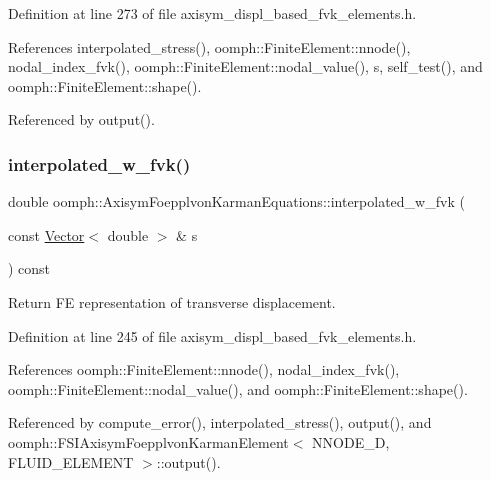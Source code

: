 Definition at line 273 of file axisym\+\_\+displ\+\_\+based\+\_\+fvk\+\_\+elements.\+h.



References interpolated\+\_\+stress(), oomph\+::\+Finite\+Element\+::nnode(), nodal\+\_\+index\+\_\+fvk(), oomph\+::\+Finite\+Element\+::nodal\+\_\+value(), s, self\+\_\+test(), and oomph\+::\+Finite\+Element\+::shape().



Referenced by output().

\mbox{\label{classoomph_1_1AxisymFoepplvonKarmanEquations_aca5188335be3d0432fbf92d493026558}} 
\subsubsection{\texorpdfstring{interpolated\+\_\+w\+\_\+fvk()}{interpolated\_w\_fvk()}\hspace{0.1cm}{\footnotesize\ttfamily [1/2]}}
{\footnotesize\ttfamily double oomph\+::\+Axisym\+Foepplvon\+Karman\+Equations\+::interpolated\+\_\+w\+\_\+fvk (\begin{DoxyParamCaption}\item[{const \hyperlink{classoomph_1_1Vector}{Vector}$<$ double $>$ \&}]{s }\end{DoxyParamCaption}) const\hspace{0.3cm}{\ttfamily [inline]}}



Return FE representation of transverse displacement. 



Definition at line 245 of file axisym\+\_\+displ\+\_\+based\+\_\+fvk\+\_\+elements.\+h.



References oomph\+::\+Finite\+Element\+::nnode(), nodal\+\_\+index\+\_\+fvk(), oomph\+::\+Finite\+Element\+::nodal\+\_\+value(), and oomph\+::\+Finite\+Element\+::shape().



Referenced by compute\+\_\+error(), interpolated\+\_\+stress(), output(), and oomph\+::\+F\+S\+I\+Axisym\+Foepplvon\+Karman\+Element$<$ N\+N\+O\+D\+E\+\_\+D, F\+L\+U\+I\+D\+\_\+\+E\+L\+E\+M\+E\+N\+T $>$\+::output().

